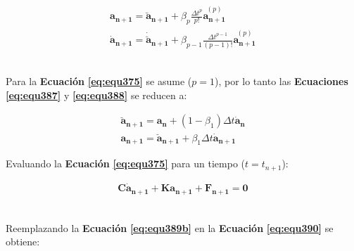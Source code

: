 \begin{ceqn} 
\begin{subequations} \label{eq:equ388} 
\begin{gather}
\mathbf{a_{n+1}} = \mathbf{\breve{a}_{n+1}} + \beta_p \frac{\Delta t^p}{p!} \overset{(p)}{\mathbf{a_{n+1}}}  \label{eq:equ388a}\\[12pt]
\mathbf{\dot{a}_{n+1}} = \mathbf{\dot{\breve{a}}_{n+1}} + \beta_{p-1} \frac{\Delta t^{p-1}}{(p-1)!} \overset{(p)}{\mathbf{a_{n+1}}}  \label{eq:equ388b}
\end{gather}  
\end{subequations} 
\end{ceqn}
\\
Para la \textbf{Ecuación} \textbf{\ref{eq:equ375}} se asume ($p=1$), por lo tanto las \textbf{Ecuaciones} \textbf{\ref{eq:equ387}} y \textbf{\ref{eq:equ388}} se reducen a:

\begin{ceqn} 
\begin{subequations} \label{eq:equ389} 
\begin{gather}
\mathbf{\breve{a}_{n+1}} = \mathbf{a_{n}} + (1-\beta_1) \Delta t \mathbf{\dot{a}_{n}} \label{eq:equ389a}\\[12pt]
\mathbf{a_{n+1}} = \mathbf{\breve{a}_{n+1}} + \beta_1 \Delta t \mathbf{\dot{a}_{n+1}} \label{eq:equ389b}
\end{gather}  
\end{subequations} 
\end{ceqn}

Evaluando la \textbf{Ecuación} \textbf{\ref{eq:equ375}} para un tiempo ($t=t_{n+1}$):

\begin{ceqn} %
\begin{gather}\label{eq:equ390}
 \mathbf{C}\mathbf{\dot{a}_{n+1}} + \mathbf{K}\mathbf{a_{n+1}} + \mathbf{F_{n+1}} = \mathbf{0}
\end{gather}   
\end{ceqn}
\\
Reemplazando la \textbf{Ecuación} \textbf{\ref{eq:equ389b}} en la \textbf{Ecuación} \textbf{\ref{eq:equ390}} se obtiene:

